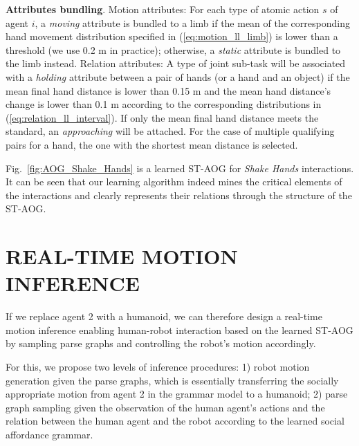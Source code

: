 \documentclass[letterpaper, 10 pt, conference]{ieeeconf}  %
\begin{document}
 \textbf{Attributes bundling}. Motion attributes: For each type of atomic action $s$ of agent $i$, a \textit{moving} attribute is bundled to a limb if the mean of the corresponding hand movement distribution specified in (\ref{eq:motion_ll_limb}) is lower than a threshold (we use 0.2 m in practice); otherwise, a \textit{static} attribute is bundled to the limb instead. Relation attributes: A type of joint sub-task will be associated with a \textit{holding} attribute between a pair of hands (or a hand and an object) if the mean final hand distance is lower than 0.15 m and the mean hand distance's change is lower than 0.1 m according to the corresponding distributions in (\ref{eq:relation_ll_interval}). If only the mean final hand distance meets the standard, an \textit{approaching} will be attached. For the case of multiple qualifying pairs for a hand, the one with the shortest mean distance is selected.

Fig.~\ref{fig:AOG_Shake_Hands} is a learned ST-AOG for \textit{Shake Hands} interactions. It can be seen that our learning algorithm indeed mines the critical elements of the interactions and clearly represents their relations through the structure of the ST-AOG.





\section{REAL-TIME MOTION INFERENCE}

If we replace agent 2 with a humanoid, we can therefore design a real-time motion inference enabling human-robot interaction based on the learned ST-AOG by sampling parse graphs and controlling the robot's motion accordingly.

For this, we propose two levels of inference procedures: 1) robot motion generation given the parse graphs, which is essentially transferring the socially appropriate motion from agent 2 in the grammar model to a humanoid; 2) parse graph sampling given the observation of the human agent's actions and the relation between the human agent and the robot according to the learned social affordance grammar.
\end{document}
